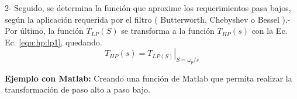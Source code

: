 \documentclass[informe.tex]{subfiles}
\begin{document}
2- Seguido, se determina la función que aproxime los requerimientos pasa bajos, según la aplicación requerida por el filtro ( Butterworth, Chebyshev o Bessel ).\newline{}- Por último, la función $T_{LP}(S)$ se transforma a la función $T_{HP}(s)$ con la Ec. Ec. \ref{eqn:hp:lp1}, quedando.
				$$T_{HP}(s)= \left.  T_{LP(S)} \right|_{S=\omega_p/s}$$
				
\textbf{Ejemplo con Matlab:} Creando una función de Matlab que permita realizar la transformación de paso alto a paso bajo.\newline  

  				
				
\end{document}
